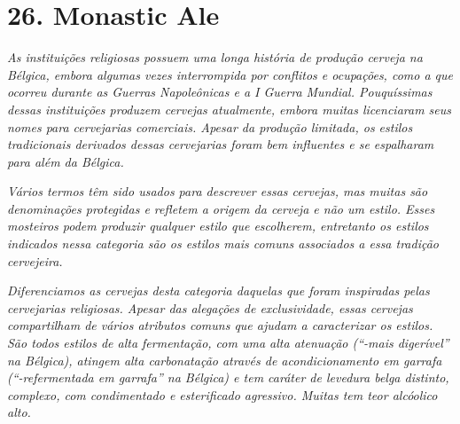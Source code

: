 \section*{26. Monastic Ale}
\textit{As instituições religiosas possuem uma longa história de produção cerveja na Bélgica, embora algumas vezes interrompida por conflitos e ocupações, como a que ocorreu durante as Guerras Napoleônicas e a I Guerra Mundial. Pouquíssimas dessas instituições produzem cervejas atualmente, embora muitas licenciaram seus nomes para cervejarias comerciais. Apesar da produção limitada, os estilos tradicionais derivados dessas cervejarias foram bem influentes e se espalharam para além da Bélgica.}

\textit{Vários termos têm sido usados para descrever essas cervejas, mas muitas são denominações protegidas e refletem a origem da cerveja e não um estilo. Esses mosteiros podem produzir qualquer estilo que escolherem, entretanto os estilos indicados nessa categoria são os estilos mais comuns associados a essa tradição cervejeira.}

\textit{Diferenciamos as cervejas desta categoria daquelas que foram inspiradas pelas cervejarias religiosas. Apesar das alegações de exclusividade, essas cervejas compartilham de vários atributos comuns que ajudam a caracterizar os estilos. São todos estilos de alta fermentação, com uma alta atenuação (“-mais digerível” na Bélgica), atingem alta carbonatação através de acondicionamento em garrafa (“-refermentada em garrafa” na Bélgica) e tem caráter de levedura belga distinto, complexo, com condimentado e esterificado agressivo. Muitas tem teor alcóolico alto.}